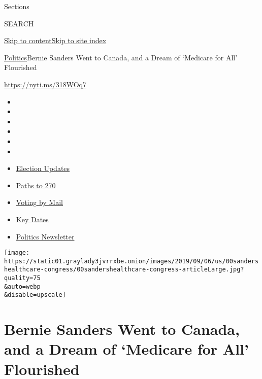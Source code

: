 Sections

SEARCH

\protect\hyperlink{site-content}{Skip to
content}\protect\hyperlink{site-index}{Skip to site index}

\href{/section/politics}{Politics}\textbar{}Bernie Sanders Went to
Canada, and a Dream of `Medicare for All' Flourished

\url{https://nyti.ms/318WOq7}

\begin{itemize}
\item
\item
\item
\item
\item
\item
\end{itemize}

\begin{itemize}
\item
  \href{https://www.nytimes3xbfgragh.onion/live/2020/09/08/us/trump-vs-biden?action=click\&pgtype=Article\&state=default\&region=TOP_BANNER\&context=storylines_menu}{Election
  Updates}
\item
  \href{https://www.nytimes3xbfgragh.onion/interactive/2020/us/elections/election-states-biden-trump.html?action=click\&pgtype=Article\&state=default\&region=TOP_BANNER\&context=storylines_menu}{Paths
  to 270}
\item
  \href{https://www.nytimes3xbfgragh.onion/interactive/2020/08/31/us/politics/vote-by-mail-deadlines.html?action=click\&pgtype=Article\&state=default\&region=TOP_BANNER\&context=storylines_menu}{Voting
  by Mail}
\item
  \href{https://www.nytimes3xbfgragh.onion/interactive/2019/us/elections/2020-presidential-election-calendar.html?action=click\&pgtype=Article\&state=default\&region=TOP_BANNER\&context=storylines_menu}{Key
  Dates}
\item
  \href{https://www.nytimes3xbfgragh.onion/newsletters/politics?action=click\&pgtype=Article\&state=default\&region=TOP_BANNER\&context=storylines_menu}{Politics
  Newsletter}
\end{itemize}

\texttt{[image: https://static01.graylady3jvrrxbe.onion/images/2019/09/06/us/00sandershealthcare-congress/00sandershealthcare-congress-articleLarge.jpg?quality=75\\\&auto=webp\\\&disable=upscale]}

\hypertarget{bernie-sanders-went-to-canada-and-a-dream-of-medicare-for-all-flourished}{%
\section{Bernie Sanders Went to Canada, and a Dream of `Medicare for
All'
Flourished}\label{bernie-sanders-went-to-canada-and-a-dream-of-medicare-for-all-flourished}}

